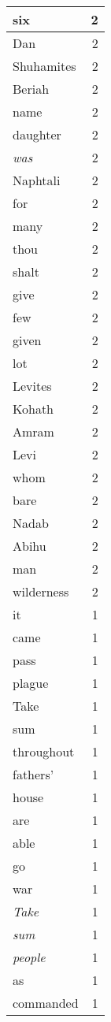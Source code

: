 \begin{center}
\begin{longtable}{l|r}
six & 2\\ \hline 
Dan & 2\\ \hline 
Shuhamites & 2\\ \hline 
Beriah & 2\\ \hline 
name & 2\\ \hline 
daughter & 2\\ \hline 
\emph{was} & 2\\ \hline 
Naphtali & 2\\ \hline 
for & 2\\ \hline 
many & 2\\ \hline 
thou & 2\\ \hline 
shalt & 2\\ \hline 
give & 2\\ \hline 
few & 2\\ \hline 
given & 2\\ \hline 
lot & 2\\ \hline 
Levites & 2\\ \hline 
Kohath & 2\\ \hline 
Amram & 2\\ \hline 
Levi & 2\\ \hline 
whom & 2\\ \hline 
bare & 2\\ \hline 
Nadab & 2\\ \hline 
Abihu & 2\\ \hline 
man & 2\\ \hline 
wilderness & 2\\ \hline 
it & 1\\ \hline 
came & 1\\ \hline 
pass & 1\\ \hline 
plague & 1\\ \hline 
Take & 1\\ \hline 
sum & 1\\ \hline 
throughout & 1\\ \hline 
fathers' & 1\\ \hline 
house & 1\\ \hline 
are & 1\\ \hline 
able & 1\\ \hline 
go & 1\\ \hline 
war & 1\\ \hline 
\emph{Take} & 1\\ \hline 
\emph{sum} & 1\\ \hline 
\emph{people} & 1\\ \hline 
as & 1\\ \hline 
commanded & 1\\ \hline 

\end{longtable}
\end{center}
